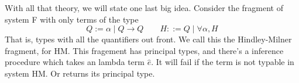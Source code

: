 \documentclass[12pt]{article}
\begin{document}
With all that theory, we will state one last big idea. Consider the fragment of system F with only terms of the type
\[
Q := \alpha \;|\; Q \rightarrow Q \quad\quad H ::=  Q \;|\; \forall \alpha, H
\]
That is, types with all the quantifiers out front.
We call this the Hindley-Milner fragment, for HM. 
This fragement has principal types, and there's a inference procedure which takes an lambda term $\hat{e}$. It will fail if the term is not typable in system HM. Or returns its principal type.
\end{document}
